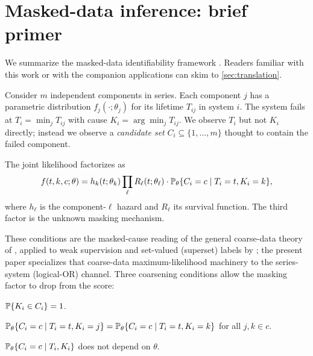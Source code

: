\section{Masked-data inference: brief primer}
\label{sec:background}

We summarize the masked-data identifiability framework
\citep{towell2026masked,heitjan1991ignorability}. Readers familiar
with this work or with the companion applications
\citep{towell2026scrnacoarsening,towell2026spatialcoarsening} can
skim to \cref{sec:translation}.

Consider $m$ independent components in series. Each component $j$
has a parametric distribution $f_j(\cdot;\theta_j)$ for its lifetime
$T_{ij}$ in system $i$. The system fails at $T_i = \min_j T_{ij}$
with cause $K_i = \arg\min_j T_{ij}$. We observe $T_i$ but not $K_i$
directly; instead we observe a \emph{candidate set} $C_i \subseteq
\{1,\ldots,m\}$ thought to contain the failed component.

The joint likelihood factorizes as
\begin{equation}
  f(t, k, c; \theta)
  = h_k(t; \theta_k) \prod_{\ell} R_\ell(t; \theta_\ell)
    \cdot \mathbb{P}_\theta\{C_i = c \mid T_i = t, K_i = k\},
  \label{eq:bg-joint}
\end{equation}
where $h_\ell$ is the component-$\ell$ hazard and $R_\ell$ its
survival function. The third factor is the unknown masking
mechanism.

These conditions are the masked-cause reading of the general
coarse-data theory of \citet{heitjan1991ignorability}, applied to
weak supervision and set-valued (superset) labels by
\citet{couso2017coarse}; the present paper specializes that coarse-data
maximum-likelihood machinery to the series-system (logical-OR) channel.
Three coarsening conditions allow the masking factor to drop from
the score:

\begin{condition}[Support, C1]
\label{cond:c1}
$\mathbb{P}\{K_i \in C_i\} = 1$.
\end{condition}

\begin{condition}[Symmetry, C2]
\label{cond:c2}
$\mathbb{P}_\theta\{C_i=c \mid T_i=t, K_i=j\} = \mathbb{P}_\theta\{C_i=c \mid
T_i=t, K_i=k\}$ for all $j,k \in c$.
\end{condition}

\begin{condition}
\label{cond:c3}
$\mathbb{P}_\theta\{C_i=c \mid T_i, K_i\}$ does not depend on $\theta$.
\end{condition}

